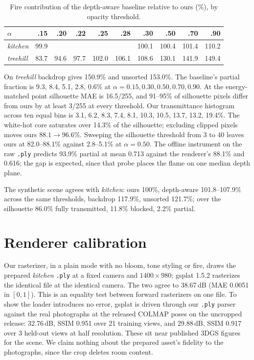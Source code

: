 \documentclass[acmtog,nonacm]{acmart}
\begin{document}
\begin{table}
\caption{Fire contribution of the depth-aware baseline relative to ours (\%), by opacity threshold.}
\footnotesize
\begin{tabular}{lrrrrrrrrr}
\toprule
$\alpha$ & .15 & .20 & .22 & .25 & .28 & .30 & .50 & .70 & .90 \\
\midrule
\emph{kitchen} & 99.9 & & & & & 100.1 & 100.4 & 101.4 & 110.2 \\
\emph{treehill} & 83.7 & 94.6 & 97.7 & 102.0 & 106.1 & 108.6 & 130.1 & 141.9 & 149.4 \\
\bottomrule
\end{tabular}
\end{table}

On \emph{treehill} backdrop gives 150.9\% and unsorted 153.0\%. The baseline's partial fraction is 9.3, 8.4, 5.1, 2.8, 0.6\% at $\alpha=0.15,0.30,0.50,0.70,0.90$. At the energy-matched point silhouette MAE is 16.5/255, and 91--95\% of silhouette pixels differ from ours by at least 3/255 at every threshold. Our transmittance histogram across ten equal bins is 3.1, 6.2, 8.3, 7.4, 8.1, 10.3, 10.5, 13.7, 13.2, 19.4\%. The white-hot core saturates over 14.3\% of the silhouette; excluding clipped pixels moves ours $88.1\to96.6$\%. Sweeping the silhouette threshold from 3 to 40 leaves ours at 82.0--88.1\% against 2.8--5.1\% at $\alpha=0.50$. The offline instrument on the raw \texttt{.ply} predicts 93.9\% partial at mean 0.713 against the renderer's 88.1\% and 0.616; the gap is expected, since that probe places the flame on one median depth plane.

The synthetic scene agrees with \emph{kitchen}: ours 100\%, depth-aware 101.8--107.9\% across the same thresholds, backdrop 117.9\%, unsorted 121.7\%; over the silhouette 86.0\% fully transmitted, 11.8\% blocked, 2.2\% partial.

\section{Renderer calibration}
Our rasterizer, in a plain mode with no bloom, tone styling or fire, draws the prepared \emph{kitchen} \texttt{.ply} at a fixed camera and $1400\times980$; gsplat 1.5.2 rasterizes the identical file at the identical camera. The two agree to 38.67\,dB (MAE 0.0051 in $[0,1]$). This is an equality test between forward rasterizers on one file. To show the loader introduces no error, gsplat is driven through our \texttt{.ply} parser against the real photographs at the released COLMAP poses on the uncropped release: 32.76\,dB, SSIM 0.951 over 21 training views, and 29.88\,dB, SSIM 0.917 over 3 held-out views at half resolution. These sit near published 3DGS figures for the scene. We claim nothing about the prepared asset's fidelity to the photographs, since the crop deletes room content.
\end{document}

